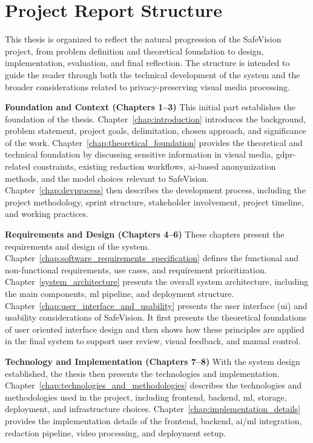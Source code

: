 
\section{Project Report Structure}

This thesis is organized to reflect the natural progression of the \gls{SafeVision} project, from problem definition and theoretical foundation to design, implementation, evaluation, and final reflection. The structure is intended to guide the reader through both the technical development of the system and the broader considerations related to privacy-preserving visual media processing.

\noindent\textbf{Foundation and Context (Chapters 1--3)}
This initial part establishes the foundation of the thesis. Chapter~\ref{chap:introduction} introduces the background, problem statement, project goals, delimitation, chosen approach, and significance of the work. Chapter~\ref{chap:theoretical_foundation} provides the theoretical and technical foundation by discussing sensitive information in visual media, \gls{gdpr}-related constraints, existing redaction workflows, \acrshort{ai}-based \gls{anonymization} methods, and the model choices relevant to \gls{SafeVision}. Chapter~\ref{chap:devprocess} then describes the development process, including the project methodology, sprint structure, stakeholder involvement, project timeline, and working practices.

\noindent\textbf{Requirements and Design (Chapters 4--6)}
These chapters present the requirements and design of the system. Chapter~\ref{chap:software_requirements_specification} defines the functional and non-functional requirements, use cases, and requirement prioritization. Chapter~\ref{system_architecture} presents the overall system architecture, including the main components, \acrshort{ml} pipeline, and deployment structure. Chapter~\ref{chap:user_interface_and_usability} presents the user interface (\acrshort{ui}) and usability considerations of \gls{SafeVision}. It first presents the theoretical foundations of user oriented interface design and then shows how these principles are applied in the final system to support user review, visual feedback, and manual control.

\noindent\textbf{Technology and Implementation (Chapters 7--8)}  
With the system design established, the thesis then presents the technologies and implementation. Chapter~\ref{chap:technologies_and_methodologies} describes the technologies and methodologies used in the project, including frontend, backend, \acrshort{ml}, storage, deployment, and infrastructure choices. Chapter~\ref{chap:implementation_details} provides the implementation details of the frontend, backend, \acrshort{ai}/\acrshort{ml} integration, redaction pipeline, video processing, and deployment setup.

